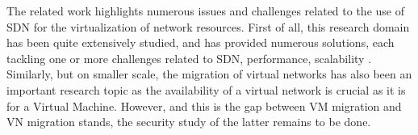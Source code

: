 The related work highlights numerous issues and challenges related to the use of SDN for the virtualization of network resources.
First of all, this research domain has been quite extensively studied, and has provided numerous solutions, each tackling one or more challenges related to SDN, performance, scalability \etc.
Similarly, but on smaller scale, the migration of virtual networks has also been an important research topic as the availability of a virtual network is crucial as it is for a Virtual Machine.
However, and this is the gap between VM migration and VN migration stands, the security study of the latter remains to be done.
